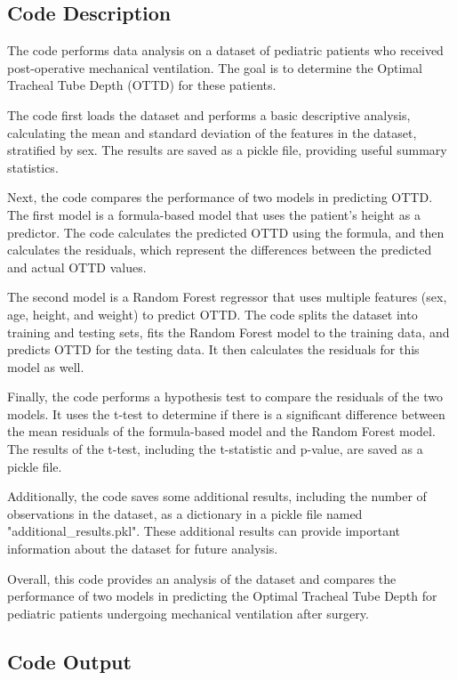\documentclass[11pt]{article}
\begin{document}
\subsection{Code Description}

The code performs data analysis on a dataset of pediatric patients who received post-operative mechanical ventilation. The goal is to determine the Optimal Tracheal Tube Depth (OTTD) for these patients.

The code first loads the dataset and performs a basic descriptive analysis, calculating the mean and standard deviation of the features in the dataset, stratified by sex. The results are saved as a pickle file, providing useful summary statistics.

Next, the code compares the performance of two models in predicting OTTD. The first model is a formula-based model that uses the patient's height as a predictor. The code calculates the predicted OTTD using the formula, and then calculates the residuals, which represent the differences between the predicted and actual OTTD values.

The second model is a Random Forest regressor that uses multiple features (sex, age, height, and weight) to predict OTTD. The code splits the dataset into training and testing sets, fits the Random Forest model to the training data, and predicts OTTD for the testing data. It then calculates the residuals for this model as well.

Finally, the code performs a hypothesis test to compare the residuals of the two models. It uses the t-test to determine if there is a significant difference between the mean residuals of the formula-based model and the Random Forest model. The results of the t-test, including the t-statistic and p-value, are saved as a pickle file.

Additionally, the code saves some additional results, including the number of observations in the dataset, as a dictionary in a pickle file named "additional\_results.pkl". These additional results can provide important information about the dataset for future analysis.

Overall, this code provides an analysis of the dataset and compares the performance of two models in predicting the Optimal Tracheal Tube Depth for pediatric patients undergoing mechanical ventilation after surgery.

\subsection{Code Output}
\end{document}
